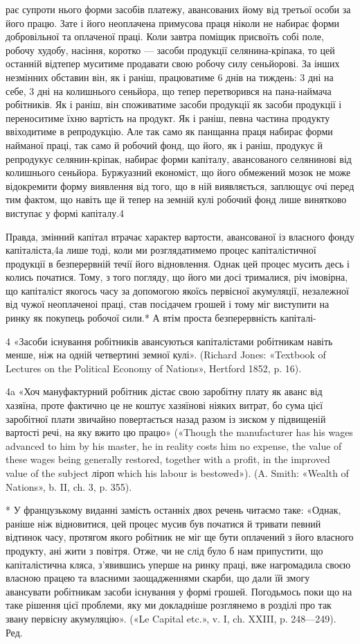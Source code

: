 рає супроти нього форми засобів платежу, авансованих йому
від третьої особи за його працю. Зате і його неоплачена примусова
праця ніколи не набирає форми добровільної та оплаченої
праці. Коли завтра поміщик присвоїть собі поле, робочу худобу,
насіння, коротко — засоби продукції селянина-кріпака,
то цей останній відтепер муситиме продавати свою робочу силу
сеньйорові. За інших незмінних обставин він, як і раніш, працюватиме
6 днів на тиждень: 3 дні на себе, 3 дні на колишнього
сеньйора, що тепер перетворився на пана-наймача робітників.
Як і раніш, він споживатиме засоби продукції як засоби продукції
і переноситиме їхню вартість на продукт. Як і раніш, певна
частина продукту ввіходитиме в репродукцію. Але так само як
панщанна праця набирає форми найманої праці, так само й робочий
фонд, що його, як і раніш, продукує й репродукує селянин-кріпак,
набирає форми капіталу, авансованого селянинові від
колишнього сеньйора. Буржуазний економіст, що його обмежений
мозок не може відокремити форму виявлення від того, що
в ній виявляється, заплющує очі перед тим фактом, що навіть
ще й тепер на земній кулі робочий фонд лише винятково виступає
у формі капіталу.4

Правда, змінний капітал втрачає характер вартости, авансованої
із власного фонду капіталіста,4а лише тоді, коли ми розглядатимемо
процес капіталістичної продукції в безперервній течії
його відновлення. Однак цей процес мусить десь і колись початися.
Тому, з того погляду, що його ми досі трималися, річ
імовірна, що капіталіст якогось часу за допомогою якоїсь первісної
акумуляції, незалежної від чужої неоплаченоі праці,
став посідачем грошей і тому міг виступити на ринку як
покупець робочої сили.* А втім проста безперервність капіталі-

4 «Засоби існування робітників авансуються капіталістами робітникам
навіть менше, ніж на одній четвертині земної кулі». (Richard
Jones: «Textbook of Lectures on the Political Economy of Nations», Hertford
1852, p. 16).

4a «Хоч мануфактурний робітник дістає свою заробітну плату як
аванс від хазяїна, проте фактично це не коштує хазяїнові ніяких витрат,
бо сума цієї заробітної плати звичайно повертається назад разом із зиском
у підвищеній вартості речі, на яку вжито цю працю» («Though the
manufacturer has his wages advanced to him by his master, he in reality
costs him no expense, the value of these wages being generally restored,
together with a profit, in the improved value of the subject ліроп
which his labour is bestowed»). (A. Smith: «Wealth of Nations», b. II,
ch. 3, p. 355).

* У французькому виданні замість останніх двох речень читаємо
таке: «Однак, раніше ніж відновитися, цей процес мусив був початися
й тривати певний відтинок часу, протягом якого робітник не міг ще бути
оплачений з його власного продукту, ані жити з повітря. Отже, чи не слід
було б нам припустити, що капіталістична кляса, з’явившись уперше
на ринку праці, вже нагромадила своєю власною працею та власними
заощадженнями скарби, що дали їй змогу авансувати робітникам засоби
існування у формі грошей. Погодьмось поки що на таке рішення цієї
проблеми, яку ми докладніше розглянемо в розділі про так звану первісну
акумуляцію». («Le Capital etc.», v. I, ch. XXIII, p. 248—249). Ред.
